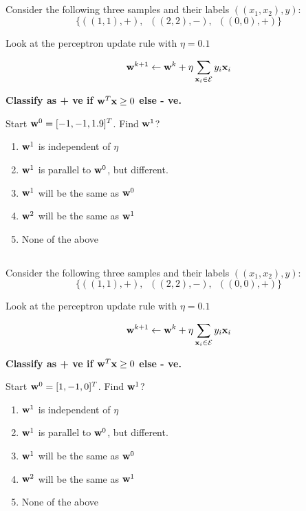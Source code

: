 \begin{frame}
\section{}
Consider the following three samples and their labels $((x_1, x_2), y)$:
\[ \{ ((1,1), +),\,\,\ ((2,2), -),\,\,\,  ((0,0),+) \}\]

Look at the perceptron update rule with $\eta = 0.1$

\[ {\bf w}^{k+1}\leftarrow {\bf w}^k + \eta \sum_{{\bf x}_i \in {\cal E}}y_i {\bf x}_i \]

{\bf Classify as + ve if ${\bf w}^T{\bf x} \geq 0$ else - ve.}

  Start ${\bf w}^0 = [-1,-1, 1.9]^T $.  Find ${\bf w}^1$?
    \begin{enumerate}[label=(\Alph*)]
      \item ${\bf w}^1$ is independent of $\eta$
     \item ${\bf w}^1$ is parallel to ${\bf w}^0$, but different.
     \item ${\bf w}^1$ will be the same as ${\bf w}^0$
     \item ${\bf w}^2$ will be the same as ${\bf w}^1$
     \item None of the above    %
    \end{enumerate}
\end{frame}


\begin{frame}
\section{}
Consider the following three samples and their labels $((x_1, x_2), y)$:
\[ \{ ((1,1), +),\,\,\ ((2,2), -),\,\,\,  ((0,0),+) \}\]

Look at the perceptron update rule with $\eta = 0.1$

\[ {\bf w}^{k+1}\leftarrow {\bf w}^k + \eta \sum_{{\bf x}_i \in {\cal E}}y_i {\bf x}_i \]

{\bf Classify as + ve if ${\bf w}^T{\bf x} \geq 0$ else - ve.}

  Start ${\bf w}^0 = [1,-1, 0]^T $.  Find ${\bf w}^1$?
     \begin{enumerate}[label=(\Alph*)]
       \item ${\bf w}^1$ is independent of $\eta$   %
      \item ${\bf w}^1$ is parallel to ${\bf w}^0$, but different.
      \item ${\bf w}^1$ will be the same as ${\bf w}^0$   %
      \item ${\bf w}^2$ will be the same as ${\bf w}^1$   %
      \item None of the above    %
     \end{enumerate}
\end{frame}

